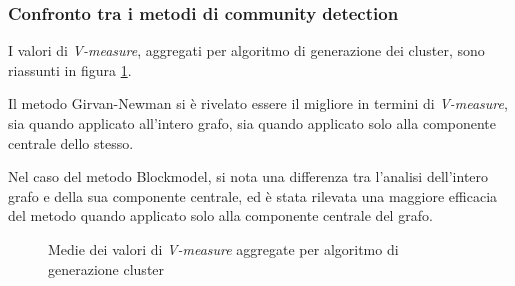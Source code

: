 \documentclass[12pt,a4paper,twoside]{report}
\begin{document}
\subsubsection{Confronto tra i metodi di community detection}

I valori di \textit{V-measure}, aggregati per algoritmo di generazione dei cluster, sono riassunti
in figura \ref{img:vmeasurecluster}.

Il metodo Girvan-Newman si è rivelato essere il migliore in termini di \textit{V-measure}, sia
quando applicato all'intero grafo, sia quando applicato solo alla componente centrale dello stesso.

Nel caso del metodo Blockmodel, si nota una differenza tra l'analisi dell'intero grafo e della sua
componente centrale, ed è stata rilevata una maggiore efficacia del metodo quando applicato solo
alla componente centrale del grafo.

\begin{figure}[H]
    \begin{minipage}[c]{0.60\textwidth}
    \setlength{\fboxrule}{0pt}	%
    \end{minipage}
    \begin{minipage}[c]{0.32\textwidth}
        \caption{Medie dei valori di \textit{V-measure} aggregate per algoritmo di generazione cluster }
    \label{img:vmeasurecluster}
    \end{minipage}
\end{figure}
\end{document}

